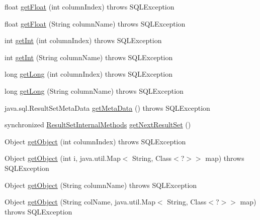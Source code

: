\begin{DoxyCompactItemize}
float \mbox{\hyperlink{classcom_1_1mysql_1_1jdbc_1_1_result_set_impl_a1a4fb5819b39bf4594b05bdec4527df3}{get\+Float}} (int column\+Index)  throws S\+Q\+L\+Exception 
\item 
float \mbox{\hyperlink{classcom_1_1mysql_1_1jdbc_1_1_result_set_impl_a3414afd7b9d00effb055ef1fbfd03183}{get\+Float}} (String column\+Name)  throws S\+Q\+L\+Exception 
\item 
int \mbox{\hyperlink{classcom_1_1mysql_1_1jdbc_1_1_result_set_impl_a15131d50936eef4bd078f5471ee12c39}{get\+Int}} (int column\+Index)  throws S\+Q\+L\+Exception 
\item 
int \mbox{\hyperlink{classcom_1_1mysql_1_1jdbc_1_1_result_set_impl_a3c2086aa55638f2572fc804f6a5cc3b9}{get\+Int}} (String column\+Name)  throws S\+Q\+L\+Exception 
\item 
long \mbox{\hyperlink{classcom_1_1mysql_1_1jdbc_1_1_result_set_impl_a5bc3a43633fc4301e35603a9516712c3}{get\+Long}} (int column\+Index)  throws S\+Q\+L\+Exception 
\item 
long \mbox{\hyperlink{classcom_1_1mysql_1_1jdbc_1_1_result_set_impl_aeb04e9c6a16658943e9da23b0e5a7ccd}{get\+Long}} (String column\+Name)  throws S\+Q\+L\+Exception 
\item 
java.\+sql.\+Result\+Set\+Meta\+Data \mbox{\hyperlink{classcom_1_1mysql_1_1jdbc_1_1_result_set_impl_adf8449b6f578c8e424326ec7a25a6b97}{get\+Meta\+Data}} ()  throws S\+Q\+L\+Exception 
\item 
synchronized \mbox{\hyperlink{interfacecom_1_1mysql_1_1jdbc_1_1_result_set_internal_methods}{Result\+Set\+Internal\+Methods}} \mbox{\hyperlink{classcom_1_1mysql_1_1jdbc_1_1_result_set_impl_a95c75be5755be8089539b6e62059ff5d}{get\+Next\+Result\+Set}} ()
\item 
Object \mbox{\hyperlink{classcom_1_1mysql_1_1jdbc_1_1_result_set_impl_ac61c9d2a780132e736f4acbdb25da396}{get\+Object}} (int column\+Index)  throws S\+Q\+L\+Exception 
\item 
Object \mbox{\hyperlink{classcom_1_1mysql_1_1jdbc_1_1_result_set_impl_aa6397841fe3f64b790d65903480a8e46}{get\+Object}} (int i, java.\+util.\+Map$<$ String, Class$<$?$>$$>$ map)  throws S\+Q\+L\+Exception 
\item 
Object \mbox{\hyperlink{classcom_1_1mysql_1_1jdbc_1_1_result_set_impl_a1880c60be672be45187ea22e8b63768b}{get\+Object}} (String column\+Name)  throws S\+Q\+L\+Exception 
\item 
Object \mbox{\hyperlink{classcom_1_1mysql_1_1jdbc_1_1_result_set_impl_a4817a6b6b87b9639afd00209f1c6fac5}{get\+Object}} (String col\+Name, java.\+util.\+Map$<$ String, Class$<$?$>$$>$ map)  throws S\+Q\+L\+Exception 

\end{DoxyCompactItemize}
